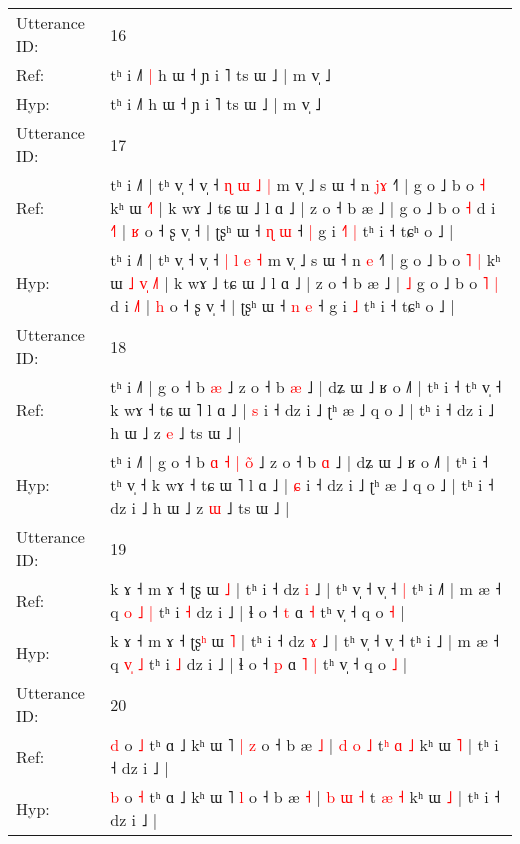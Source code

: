 \documentclass[10pt]{article}
\DeclareRobustCommand{\hl}[1]{{\textcolor{red}{#1}}}
\begin{document}
\begin{longtable}{ll}
 \\
\midrule
Utterance ID: & 16 \\
Ref: & tʰ i ˩˥\hl{ }\hl{|} h ɯ ˧ ɲ i ˥ ts ɯ ˩ | m v̩ ˩
 \\
Hyp: & tʰ i ˩˥\hl{}\hl{} h ɯ ˧ ɲ i ˥ ts ɯ ˩ | m v̩ ˩
 \\
\midrule
Utterance ID: & 17 \\
Ref: & tʰ i ˩˥ | tʰ v̩ ˧ v̩ ˧ \hl{ɳ} \hl{ɯ} \hl{˩} \hl{|} m v̩ ˩ s ɯ ˧ n \hl{j}\hl{ɤ} ˧˥ | g o ˩ b o\hl{}\hl{} \hl{˧} kʰ ɯ\hl{}\hl{}\hl{}\hl{}\hl{} \hl{˧}˥ | k wɤ ˩ tɕ ɯ ˩ l ɑ ˩ | z o ˧ b æ ˩ |\hl{}\hl{} g o ˩ b o\hl{}\hl{} \hl{˧} d i \hl{˧}˥ | \hl{ʁ} o ˧ ʂ v̩ ˧ | ʈʂʰ ɯ ˧ \hl{ɳ} \hl{ɯ} ˧\hl{ }\hl{|} g i\hl{ }\hl{˧}\hl{˥} \hl{|} tʰ i ˧ tɕʰ o ˩ |
 \\
Hyp: & tʰ i ˩˥ | tʰ v̩ ˧ v̩ ˧ \hl{|} \hl{l} \hl{e} \hl{˧} m v̩ ˩ s ɯ ˧ n \hl{}\hl{e} ˧˥ | g o ˩ b o\hl{ }\hl{˥} \hl{|} kʰ ɯ\hl{ }\hl{˩}\hl{ }\hl{v}\hl{̩} \hl{˩}˥ | k wɤ ˩ tɕ ɯ ˩ l ɑ ˩ | z o ˧ b æ ˩ |\hl{ }\hl{˩} g o ˩ b o\hl{ }\hl{˥} \hl{|} d i \hl{˩}˥ | \hl{h} o ˧ ʂ v̩ ˧ | ʈʂʰ ɯ ˧ \hl{n} \hl{e} ˧\hl{}\hl{} g i\hl{}\hl{}\hl{} \hl{˩} tʰ i ˧ tɕʰ o ˩ |
 \\
\midrule
Utterance ID: & 18 \\
Ref: & tʰ i ˩˥ | g o ˧ b\hl{}\hl{}\hl{}\hl{}\hl{}\hl{} \hl{}\hl{æ} ˩ z o ˧ b \hl{æ} ˩ | dʑ ɯ ˩ ʁ o ˩˥ | tʰ i ˧ tʰ v̩ ˧ k wɤ ˧ tɕ ɯ ˥ l ɑ ˩ | \hl{s} i ˧ dz i ˩ ʈʰ æ ˩ q o ˩ | tʰ i ˧ dz i ˩ h ɯ ˩ z \hl{e} ˩ ts ɯ ˩ |
 \\
Hyp: & tʰ i ˩˥ | g o ˧ b\hl{ }\hl{ɑ}\hl{ }\hl{˧}\hl{ }\hl{|} \hl{o}\hl{̃} ˩ z o ˧ b \hl{ɑ} ˩ | dʑ ɯ ˩ ʁ o ˩˥ | tʰ i ˧ tʰ v̩ ˧ k wɤ ˧ tɕ ɯ ˥ l ɑ ˩ | \hl{ɕ} i ˧ dz i ˩ ʈʰ æ ˩ q o ˩ | tʰ i ˧ dz i ˩ h ɯ ˩ z \hl{ɯ} ˩ ts ɯ ˩ |
 \\
\midrule
Utterance ID: & 19 \\
Ref: & k ɤ ˧ m ɤ ˧ ʈʂ\hl{} ɯ \hl{˩} | tʰ i ˧ dz \hl{i} ˩ | tʰ v̩ ˧ v̩ ˧\hl{ }\hl{|} tʰ i ˩\hl{˥} | m æ ˧ q \hl{o}\hl{ }\hl{˩} \hl{|} tʰ i \hl{˧} dz i ˩ | ɬ o ˧ \hl{t} ɑ\hl{}\hl{} \hl{˧} tʰ v̩ ˧ q o \hl{˧} |
 \\
Hyp: & k ɤ ˧ m ɤ ˧ ʈʂ\hl{ʰ} ɯ \hl{˥} | tʰ i ˧ dz \hl{ɤ} ˩ | tʰ v̩ ˧ v̩ ˧\hl{}\hl{} tʰ i ˩\hl{} | m æ ˧ q \hl{}\hl{v}\hl{̩} \hl{˩} tʰ i \hl{˩} dz i ˩ | ɬ o ˧ \hl{p} ɑ\hl{ }\hl{˥} \hl{|} tʰ v̩ ˧ q o \hl{˩} |
 \\
\midrule
Utterance ID: & 20 \\
Ref: & \hl{d} o \hl{˩} tʰ ɑ ˩ kʰ ɯ ˥\hl{ }\hl{|} \hl{z} o ˧ b æ \hl{˩} | \hl{d} \hl{o} \hl{˩} t\hl{ʰ} \hl{ɑ} \hl{˩} kʰ ɯ \hl{˥} | tʰ i ˧ dz i ˩ |
 \\
Hyp: & \hl{b} o \hl{˧} tʰ ɑ ˩ kʰ ɯ ˥\hl{}\hl{} \hl{l} o ˧ b æ \hl{˧} | \hl{b} \hl{ɯ} \hl{˧} t\hl{} \hl{æ} \hl{˧} kʰ ɯ \hl{˩} | tʰ i ˧ dz i ˩ |

\end{longtable}
\end{document}
